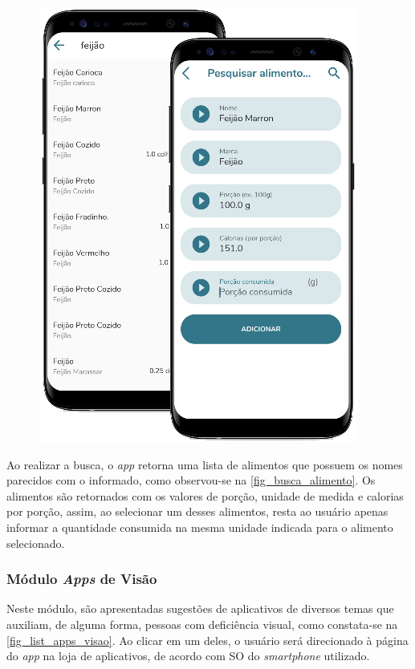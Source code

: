 \begin{figure}[htb]
\begin{minipage}{0.58\textwidth}
        \includegraphics[scale=0.66]{Imagens/desenvolvimento/app/busca_alimento.png}
    \end{minipage}
\end{figure}

Ao realizar a busca, o \emph{app} retorna uma lista de alimentos que possuem os nomes parecidos com o
informado, como observou-se na \autoref{fig_busca_alimento}. Os alimentos são retornados com os valores de
porção, unidade de medida e calorias por porção, assim, ao selecionar um desses alimentos, resta ao usuário
apenas informar a quantidade consumida na mesma unidade indicada para o alimento selecionado.

\newpage

\subsubsection{Módulo \emph{Apps} de Visão}

Neste módulo, são apresentadas sugestões de aplicativos de diversos temas que auxiliam, de alguma forma, pessoas
com deficiência visual, como constata-se na \autoref{fig_list_apps_visao}. Ao clicar em um deles, o usuário será
direcionado à página do \emph{app} na loja de aplicativos, de acordo com SO do \emph{smartphone} utilizado.

